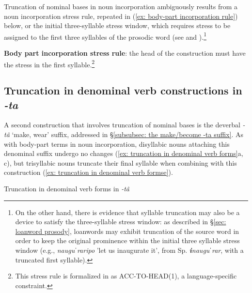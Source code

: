 Truncation of nominal bases in noun incorporation ambiguously results from a noun incorporation stress rule, repeated in (\ref{ex: body-part incorporation rule}) below, or the initial three-syllable stress window, which requires stress to be assigned to the first three syllables of the prosodic word (see  and ).\footnote{On the other hand, there is evidence that syllable truncation may also be a device to satisfy the three-syllable stress window: as described in §\ref{sec: loanword prosody},  loanwords may exhibit truncation of the source word in order to keep the original prominence within the initial three syllable stress window (e.g., \textit{nauguˈraripo} 'let us inaugurate it', from Sp. \textit{\textbf{i}nauguˈrar}, with a truncated first syllable).}

\ea\label{ex: body-part incorporation rule}
\textbf{Body part incorporation stress rule}: the head of the construction must have the stress in the first syllable.\footnote{This stress rule is formalized in \citet{caballero2011morphologically} as ACC-TO-HEAD(1), a language-specific constraint.}\\

\z

\subsection{Truncation in denominal verb constructions in \textit{-ta}}
\label{subsec: truncation in denominal verb constructions}

A second construction that involves truncation of nominal bases is the deverbal \textit{-tâ} `make, wear' suffix, addressed in §\ref{subsubsec: the make/become -ta suffix}. As with body-part terms in noun incorporation, disyllabic nouns attaching this denominal suffix undergo no changes (\ref{ex: truncation in denominal verb forms}a, c), but trisyllabic nouns truncate their final syllable when combining with this construction (\ref{ex: truncation in denominal verb formse}).

\ea\label{ex: truncation in denominal verb forms}
{Truncation in denominal verb forms in \textit{-tâ}}

